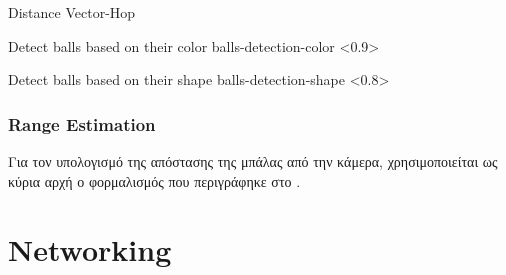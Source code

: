 \begin{algorithm}[H]
	\caption[Distance Vector-Hop]{Distance Vector-Hop}\label{alg:DV-Hop}
	\begin{algorithmic}[1]
			
        \State
	\end{algorithmic}
\end{algorithm}

%
{Detect balls based on their color}%
{balls-detection-color}%
<0.9>

%
{Detect balls based on their shape}%
{balls-detection-shape}%
<0.8>


\subsubsection{Range Estimation}
Για τον υπολογισμό της απόστασης της μπάλας από την κάμερα, χρησιμοποιείται ως κύρια αρχή ο φορμαλισμός που περιγράφηκε στο .

\section{Networking}


